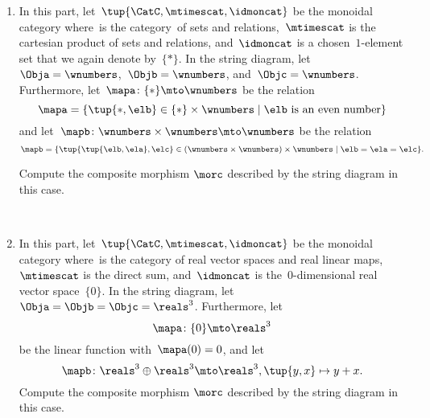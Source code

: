 \begin{gradedexercise}
\begin{enumerate}
        \item In this part, let~$\tup{\CatC,\mtimescat,\idmoncat}$ be the monoidal category where~\CatC is the category~\Rel of sets and relations,~$\mtimescat$ is the cartesian product of sets and relations, and~$\idmoncat$ is a chosen~$1$-element set that we again denote by~$\{ * \}$.
        In the string diagram, let~$\Obja = \wnumbers$,~$\Objb = \wnumbers$, and~$\Objc = \wnumbers$.
        Furthermore, let~$\mapa\colon \{ * \} \mto \wnumbers$ be the relation
        \begin{equation}
            \mapa = \{ \tup{*, \elb} \in \{ *\} \times \wnumbers \mid \elb \text{ is an even number} \}
        \end{equation}
        and let~$\mapb \colon \wnumbers \times \wnumbers \mto \wnumbers$ be the relation
        \begin{equation}
            \mapb = \{ \tup{\tup{\elb, \ela}, \elc} \in (\wnumbers \times \wnumbers) \times \wnumbers \mid \elb = \ela = \elc \}.
        \end{equation}

        Compute the composite morphism $\morc$ described by the string diagram in this case.

        \

        \item In this part, let~$\tup{\CatC,\mtimescat,\idmoncat}$ be the monoidal category where~\CatC is the category of real vector spaces and real linear maps,~$\mtimescat$ is the direct sum, and~$\idmoncat$ is the~$0$-dimensional real vector space~$\{ 0 \}$.
        In the string diagram, let~$\Obja = \Objb = \Objc = \reals^3$.
        Furthermore, let
        \begin{equation}
            \mapa\colon \{ 0 \} \mto \reals^3
        \end{equation}
        be the linear function with~$\mapa(0) = 0$, and let
        \begin{equation}
            \mapb \colon \reals^3 \oplus \reals^3 \mto \reals^3, \tup{y, x} \mapsto y + x.
        \end{equation}
        Compute the composite morphism $\morc$ described by the string diagram in this case.



\end{enumerate}
\end{gradedexercise}
